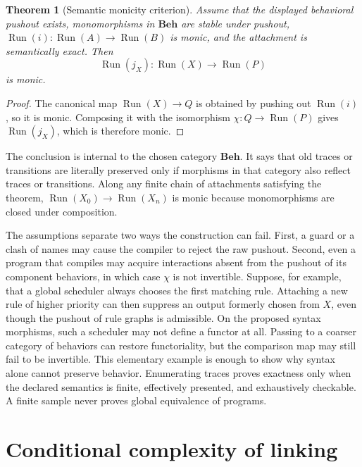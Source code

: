 \documentclass[11pt]{article}
\newtheorem{theorem}{Theorem}[section]
\newcommand{\Beh}{\mathbf{Beh}}
\DeclareMathOperator{\Run}{Run}
\begin{document}
\begin{theorem}[Semantic monicity criterion]\label{thm:behavioral-persistence}
Assume that the displayed behavioral pushout exists, monomorphisms in
\(\Beh\) are stable under pushout, \(\Run(i):\Run(A)\to\Run(B)\) is monic,
and the attachment is semantically exact.  Then
\[
 \Run(j_X):\Run(X)\longrightarrow\Run(P)
\]
is monic.
\end{theorem}

\begin{proof}
The canonical map \(\Run(X)\to Q\) is obtained by pushing out \(\Run(i)\), so
it is monic.  Composing it with the isomorphism
\(\chi:Q\to\Run(P)\) gives \(\Run(j_X)\), which is therefore monic.
\end{proof}

The conclusion is internal to the chosen category \(\Beh\).  It says that old
traces or transitions are literally preserved only if morphisms in that
category also reflect traces or transitions.  Along any finite chain of
attachments satisfying the theorem, \(\Run(X_0)\to\Run(X_n)\) is monic because
monomorphisms are closed under composition.

The assumptions separate two ways the construction can fail.  First, a guard
or a clash of names may cause the compiler to reject the raw pushout.  Second,
even a program that compiles may acquire interactions absent from the pushout
of its component behaviors, in which case \(\chi\) is not invertible.  Suppose,
for example, that a global scheduler always chooses the first matching rule.
Attaching a new rule of higher priority can then suppress an output formerly
chosen from \(X\), even though the pushout of rule graphs is admissible.  On
the proposed syntax morphisms, such a scheduler may not define a functor at
all.  Passing to a coarser category of behaviors can restore functoriality, but
the comparison map may still fail to be invertible.  This elementary example
is enough to show why syntax alone cannot preserve behavior.  Enumerating
traces proves exactness only when the declared semantics is finite, effectively
presented, and exhaustively checkable.  A finite sample never proves global
equivalence of programs.

\section{Conditional complexity of linking}
\end{document}
